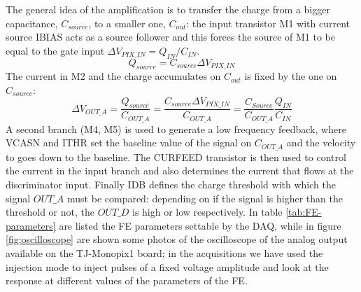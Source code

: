             The general idea of the amplification is to transfer the charge from a bigger capacitance\cite{ALPIDE-FE}, $C_{source}$, to a smaller one, $C_{out}$: the input transistor M1 with current source IBIAS acts as a source follower and this forces the source of M1 to be equal to the gate input  $\Delta V_{PIX\_IN} = Q_{IN}/C_{IN}$.
            \begin{equation}
                Q_{source} = C_{source} \Delta V_{PIX\_IN}
            \end{equation}
            The current in M2 and the charge accumulates on $C_{out}$ is fixed by the one on $C_{source}$:
            \begin{equation}
                \Delta V_{OUT\_A} = \frac{Q_{source}}{C_{OUT\_A}} = \frac{C_{source}\Delta V_{PIX\_IN}}{C_{OUT\_A}}  = \frac{C_{Source}}{C_{OUT\_A}}\frac{Q_{IN}}{C_{IN}}
            \end{equation}
            A second branch (M4, M5) is used to generate a low frequency feedback, where VCASN and ITHR set the baseline value of the signal on $C_{OUT\_A}$ and the velocity to goes down to the baseline.
            The CURFEED transistor is then used to control the current in the input branch and also determines the current that flows at the discriminator input. 
            Finally IDB defines the charge threshold with which the signal $OUT\_A$ must be compared: depending on if the signal is higher than the threshold or not, the $OUT\_D$ is high or low respectively.
            In table \ref{tab:FE-parameters} are listed the FE parameters settable by the DAQ, while in figure \ref{fig:oscilloscope} are shown some photos of the oscilloscope of the analog output available on the TJ-Monopix1 board; in the acquisitions we have used the injection mode to inject pulses of a fixed voltage amplitude and look at the response at different values of the parameters of the FE.
            \\  
    
